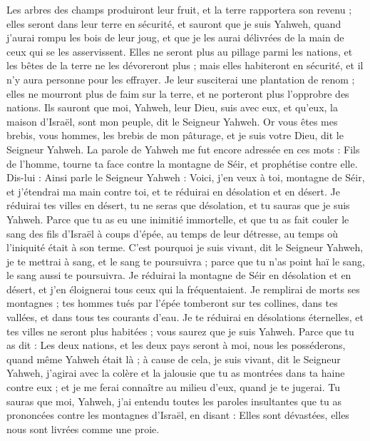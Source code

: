 \begin{multicols}{2}
Les arbres des champs produiront leur fruit, et la terre rapportera son revenu ; elles seront dans leur terre en sécurité, et sauront que je suis Yahweh, quand j'aurai rompu les bois de leur joug, et que je les aurai délivrées de la main de ceux qui se les asservissent.
Elles ne seront plus au pillage parmi les nations, et les bêtes de la terre ne les dévoreront plus ; mais elles habiteront en sécurité, et il n'y aura personne pour les effrayer.
Je leur susciterai une plantation de renom ; elles ne mourront plus de faim sur la terre, et ne porteront plus l'opprobre des nations.
Ils sauront que moi, Yahweh, leur Dieu, suis avec eux, et qu'eux, la maison d'Israël, sont mon peuple, dit le Seigneur Yahweh.
Or vous êtes mes brebis, vous hommes, les brebis de mon pâturage, et je suis votre Dieu, dit le Seigneur Yahweh.
\VerseOne{}La parole de Yahweh me fut encore adressée en ces mots :
Fils de l’homme, tourne ta face contre la montagne de Séir, et prophétise contre elle.
Dis-lui : Ainsi parle le Seigneur Yahweh : Voici, j'en veux à toi, montagne de Séir, et j'étendrai ma main contre toi, et te réduirai en désolation et en désert.
Je réduirai tes villes en désert, tu ne seras que désolation, et tu sauras que je suis Yahweh.
Parce que tu as eu une inimitié immortelle, et que tu as fait couler le sang des fils d'Israël à coups d'épée, au temps de leur détresse, au temps où l’iniquité était à son terme.
C'est pourquoi je suis vivant, dit le Seigneur Yahweh, je te mettrai à sang, et le sang te poursuivra ; parce que tu n'as point haï le sang, le sang aussi te poursuivra.
Je réduirai la montagne de Séir en désolation et en désert, et j'en éloignerai tous ceux qui la fréquentaient.
Je remplirai de morts ses montagnes ; tes hommes tués par l'épée tomberont sur tes collines, dans tes vallées, et dans tous tes courants d'eau.
Je te réduirai en désolations éternelles, et tes villes ne seront plus habitées ; vous saurez que je suis Yahweh.
Parce que tu as dit : Les deux nations, et les deux pays seront à moi,  nous les posséderons, quand même Yahweh était là ;
à cause de cela, je suis vivant, dit le Seigneur Yahweh, j'agirai avec la colère et la jalousie que tu as montrées dans ta haine contre eux ; et je me ferai connaître au milieu d’eux, quand je te jugerai.
Tu sauras que moi, Yahweh, j'ai entendu toutes les paroles insultantes que tu as prononcées contre les montagnes d'Israël, en disant : Elles sont dévastées, elles nous sont livrées comme une proie.

\end{multicols}

